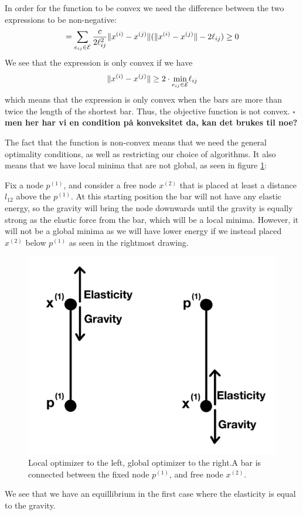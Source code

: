In order for the function to be convex we need the difference between the two expressions to be non-negative:
\begin{equation}
    =\sum\limits_{e_{ij} \in \mathcal{E}}\frac{c}{2\ell_{ij}^2} \lVert x^{(i)} - x^{(j)}\rVert (\lVert x^{(i)} - x^{(j)}\rVert - 2 \ell_{ij}) \geq 0
\end{equation}
We see that the expression is only convex if we have
$$\lVert x^{(i)} - x^{(j)}\rVert \geq 2 \cdot \underset{{e_{ij} \in \mathcal{E}}}{\text{min}}\ell_{ij}$$
which means that the expression is only convex when the bars are more than twice the length of the shortest bar. Thus, the objective function is not convex. $\square$
\textbf{men her har vi en condition på konveksitet da, kan det brukes til noe?}

The fact that the function is non-convex means that we need the general optimality conditions, as well as restricting our choice of algorithms. It also means that we have local minima that are not global, as seen in figure \ref{fig:local_optimizer}:

Fix a node $p^{(1)}$, and consider a free node $x^{(2)}$ that is placed at least a distance $l_{12}$ above the $p^{(1)}$. At this starting position the bar will not have any elastic energy, so the gravity will bring the node downwards until the gravity is equally strong as the elastic force from the bar, which will be a local minima. However, it will not be a global minima as we will have lower energy if we instead placed $x^{(2)}$ below $p^{(1)}$ as seen in the rightmost drawing. 

\begin{figure}
    \centering\includegraphics[width=0.5\columnwidth]{Bilder/local_optimizer.jpeg}
    \caption{Local optimizer to the left, global optimizer to the right.A bar is connected between the fixed node $p^{(1)}$, and free node $x^{(2)}$.}
    \label{fig:local_optimizer}
\end{figure}

We see that we have an equillibrium in the first case where the elasticity is equal to the gravity.

